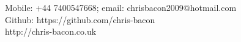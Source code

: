 \begin{center}
	Mobile: +44 7400547668; email: chrisbacon2009@hotmail.com\\
	Github: https://github.com/chris-bacon\\
	http://chris-bacon.co.uk
\end{center}